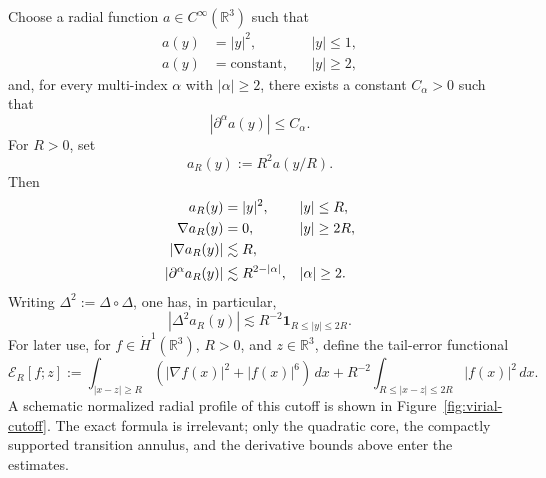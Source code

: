 \documentclass[10pt,a4paper]{amsart}
\numberwithin{equation}{section}
\newcommand{\R}{\mathbb R}
\begin{document}
Choose a radial function $a\in C^\infty(\R^3)$ such that
\begin{align*}
  a(y)&=|y|^2, && |y|\le1,\\
  a(y)&=\text{constant}, && |y|\ge2,
\end{align*}
and, for every multi-index $\alpha$ with $|\alpha|\ge2$, there exists a constant $C_\alpha>0$ such that
\begin{equation*}
  |\partial^\alpha a(y)|\le C_\alpha.
\end{equation*}
For $R>0$, set
\begin{equation*}
  a_R(y):=R^2a(y/R).
\end{equation*}
Then
\begin{align}
  a_R(y)&=|y|^2, && |y|\le R,\notag\\
  \nabla a_R(y)&=0, && |y|\ge2R,\notag\\
  |\nabla a_R(y)|&\lesssim R,\label{eq:aR-grad-bound}\\
  |\partial^\alpha a_R(y)|&\lesssim R^{2-|\alpha|}, && |\alpha|\ge2.\label{eq:aR-derivative-bound}
\end{align}
Writing $\Delta^2:=\Delta\circ\Delta$, one has, in particular,
\begin{equation}\label{eq:Delta2-aR-bound}
  |\Delta^2a_R(y)|\lesssim R^{-2}\mathbf 1_{R\le|y|\le2R}.
\end{equation}
For later use, for $f\in\dot H^1(\R^3)$, $R>0$, and $z\in\R^3$, define the tail-error functional
\begin{equation*}
  \mathcal E_R[f;z]
  :=\int_{|x-z|\ge R}(|\nabla f(x)|^2+|f(x)|^6)\,dx
  +R^{-2}\int_{R\le|x-z|\le2R}|f(x)|^2\,dx.
\end{equation*}
A schematic normalized radial profile of this cutoff is shown in Figure~\ref{fig:virial-cutoff}. The exact formula is irrelevant; only the quadratic core, the compactly supported transition annulus, and the derivative bounds above enter the estimates.
\end{document}
